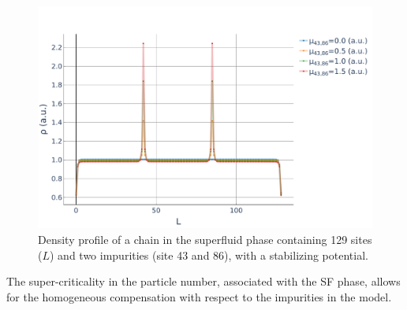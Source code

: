 \documentclass[twoside,twocolumn,9pt]{article}
\begin{document}
\begin{center}
  \begin{figure}
      \includegraphics[width=\linewidth]{../code/figures/Density-profiles-SF.pdf}
      \caption{Density profile of a chain in the superfluid phase containing 129 sites ($L$) and two impurities (site 43 and 86), with a stabilizing potential.}
      \label{fig:density-SF}
  \end{figure}
\end{center}
The super-criticality in the particle number, associated with the SF phase, allows for the homogeneous compensation with respect to the impurities in the model.
\end{document}

